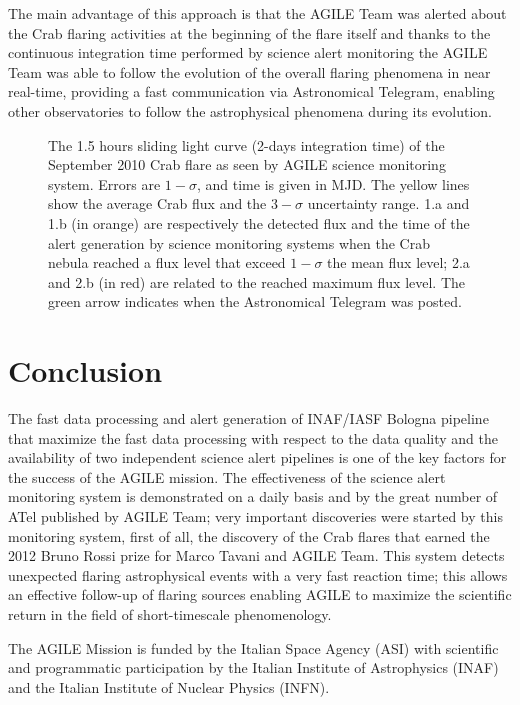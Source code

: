The main advantage  of this approach is that the AGILE Team was alerted about the Crab flaring activities at the beginning of the flare itself and thanks to the continuous integration time performed by science alert monitoring the AGILE Team was able to follow the evolution of the overall flaring phenomena in near real-time, providing a fast communication via Astronomical Telegram, enabling other observatories to follow the astrophysical phenomena during its evolution.
      
\begin{figure}[t]
\caption{The 1.5 hours sliding light curve (2-days integration time) of the September 2010 Crab flare as seen by AGILE science monitoring system. Errors are $1-\sigma$, and time is given in MJD. The yellow lines show the average Crab flux and the $3-\sigma$ uncertainty range. 1.a and 1.b (in orange) are respectively the detected flux and the time of the alert generation by science monitoring systems when the Crab nebula reached a flux level that exceed $1-\sigma$ the mean flux level; 2.a and 2.b (in red) are related to the reached maximum flux level. The green arrow indicates when the Astronomical Telegram was posted.} \label{fig_crab}
\end{figure}

\section{Conclusion}

The fast data processing and alert generation of INAF/IASF Bologna pipeline that maximize the fast data processing with respect to the data quality and the availability of two independent science alert pipelines is one of the key factors for the success of the AGILE mission. The effectiveness of the science alert monitoring system is demonstrated on a daily basis and by the great number of ATel published by AGILE Team; very important discoveries were started by this monitoring system, first of all, the discovery of the Crab flares that earned the 2012 Bruno Rossi prize for Marco Tavani and AGILE Team. This system detects unexpected flaring astrophysical events with a very fast reaction time; this allows an effective follow-up of flaring sources enabling AGILE to maximize the scientific return in the field of short-timescale phenomenology.

\acknowledgements The AGILE Mission is funded by the Italian Space Agency (ASI) with scientific and programmatic participation by the Italian Institute of Astrophysics (INAF) and the Italian Institute of Nuclear Physics (INFN). 



